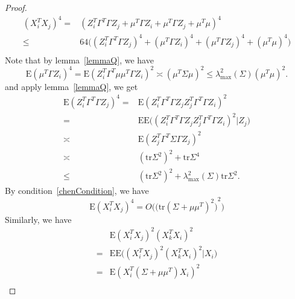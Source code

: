 \documentclass[review]{elsarticle}
\theoremstyle{plain}
\theoremstyle{definition}
\theoremstyle{remark}
\begin{document}
\begin{proof}
    \begin{equation}
        \begin{aligned}
            {(X_i^T X_j)}^4=&
            {(Z_i^T \Gamma^T \Gamma Z_j+\mu^T \Gamma Z_i+\mu^T \Gamma Z_j+\mu^T \mu)}^4\\
            \leq &
            64\big((Z_i^T \Gamma^T \Gamma Z_j)^4+(\mu^T \Gamma Z_i)^4+(\mu^T \Gamma Z_j)^4+(\mu^T \mu)^4\big)\\
        \end{aligned}
    \end{equation}
    Note that by lemma~\ref{lemmaQ}, we have
    \begin{equation}
        \mathrm{E}(\mu^T \Gamma Z_i)^4=
        \mathrm{E}(Z_i^T \Gamma^T \mu\mu^T \Gamma Z_i)^2
        \asymp  {(\mu^T \Sigma \mu)}^2\leq \lambda_{\max}^2(\Sigma){(\mu^T\mu)}^2.
    \end{equation}
    and apply lemma~\ref{lemmaQ}, we get
    \begin{equation}
        \begin{aligned}
            \mathrm{E}(Z_i^T \Gamma^T \Gamma Z_j)^4=&
        \mathrm{E}(Z_i^T \Gamma^T \Gamma Z_j Z_j^T \Gamma^T \Gamma Z_i)^2\\
            =&
            \mathrm{E}\mathrm{E}\big((Z_i^T \Gamma^T \Gamma Z_j Z_j^T \Gamma^T \Gamma Z_i)^2 | Z_j\big)\\
            \asymp &  \mathrm{E}{(Z_j^T \Gamma^T \Sigma \Gamma Z_j)}^2\\
            \asymp &  (\mathrm{tr}\Sigma^2)^2+\mathrm{tr}\Sigma^4\\
            \leq &  (\mathrm{tr}\Sigma^2)^2+\lambda_{\max}^2(\Sigma)\mathrm{tr}\Sigma^2.
        \end{aligned}
    \end{equation}
    By condition~\eqref{chenCondition}, we have 
    \begin{equation}\label{eq:20170220}
        \mathrm{E}{(X_i^T X_j)}^4=O\Big({\big(\mathrm{tr}(\Sigma+\mu\mu^T)^2\big)}^2\Big)
    \end{equation}
Similarly, we have
    \begin{equation}\label{eq:2}
        \begin{aligned}
            &\mathrm{E}{(X_i^T X_j)}^2{(X_k^T X_i)}^2\\
            = &
            \mathrm{E}\mathrm{E}\big({(X_i^T X_j)}^2{(X_k^T X_i)}^2| X_i\big)\\
            =&
            \mathrm{E}{(X_i^T (\Sigma+\mu\mu^T) X_i )}^2\\

\end{aligned}
\end{equation}
\end{proof}
\end{document}
